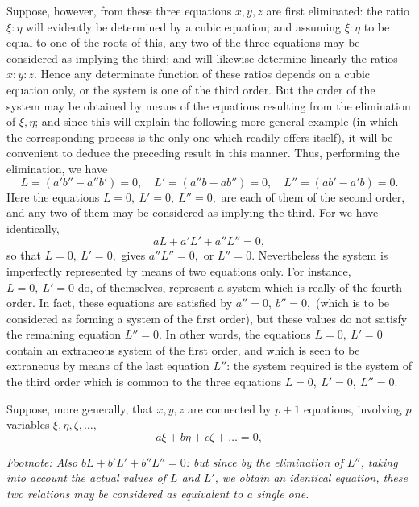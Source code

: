 \documentclass[11pt]{article}
\begin{document}
Suppose, however, from these three equations $x, y, z$ are first eliminated: the ratio $\xi : \eta$ will evidently be determined by a cubic equation; and assuming $\xi : \eta$ to be equal to one of the roots of this, any two of the three equations may be considered as implying the third; and will likewise determine linearly the ratios $x:y:z$. Hence any determinate function of these ratios depends on a cubic equation only, or the system is one of the third order. But the order of the system may be obtained by means of the equations resulting from the elimination of $\xi, \eta$; and since this will explain the following more general example (in which the corresponding process is the only one which readily offers itself), it will be convenient to deduce the preceding result in this manner. Thus, performing the elimination, we have
\[ L = (a'b'' - a''b') = 0,\quad L' = (a''b - ab'') = 0,\quad L'' = (ab' - a'b) = 0. \]
Here the equations $L = 0,\ L' = 0,\ L'' = 0,$ are each of them of the second order, and any two of them may be considered as implying the third. For we have identically,
\[ aL + a'L' + a''L'' = 0, \]
so that $L = 0,\ L' = 0,$ gives $a''L'' = 0,$ or $L'' = 0$. Nevertheless the system is imperfectly represented by means of two equations only. For instance, $L = 0,\ L' = 0$ do, of themselves, represent a system which is really of the fourth order. In fact, these equations are satisfied by $a'' = 0,\ b'' = 0,$ (which is to be considered as forming a system of the first order), but these values do not satisfy the remaining equation $L'' = 0$. In other words, the equations $L = 0,\ L' = 0$ contain an extraneous system of the first order, and which is seen to be extraneous by means of the last equation $L''$: the system required is the system of the third order which is common to the three equations $L = 0,\ L' = 0,\ L'' = 0$.

Suppose, more generally, that $x, y, z$ are connected by $p + 1$ equations, involving $p$ variables $\xi, \eta, \zeta, \ldots,$
\[ a\xi + b\eta + c\zeta + \ldots = 0, \]

\noindent\textit{Footnote: Also $bL + b'L' + b''L'' = 0$: but since by the elimination of $L''$, taking into account the actual values of $L$ and $L'$, we obtain an identical equation, these two relations may be considered as equivalent to a single one.}
\end{document}
